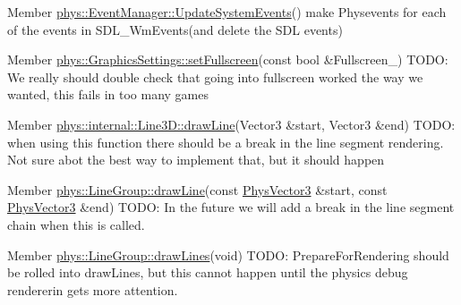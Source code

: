 \begin{DoxyDescription}
\item[Member \hyperlink{classphys_1_1EventManager_a0cf574c55def063d66d7db46a4d3e8a5}{phys::EventManager::UpdateSystemEvents}() ]make Physevents for each of the events in SDL\_\-WmEvents(and delete the SDL events) 
\end{DoxyDescription}

\label{dd/da0/todo__todo000007}
\hypertarget{dd/da0/todo__todo000007}{}
 
\begin{DoxyDescription}
\item[Member \hyperlink{classphys_1_1GraphicsSettings_aba9e127ab2cf3f20604313e39d32f7a8}{phys::GraphicsSettings::setFullscreen}(const bool \&Fullscreen\_\-) ]TODO: We really should double check that going into fullscreen worked the way we wanted, this fails in too many games 
\end{DoxyDescription}

\label{dd/da0/todo__todo000008}
\hypertarget{dd/da0/todo__todo000008}{}
 
\begin{DoxyDescription}
\item[Member \hyperlink{classphys_1_1internal_1_1Line3D_a0320e600b9f363036c63eb47527bb854}{phys::internal::Line3D::drawLine}(Vector3 \&start, Vector3 \&end) ]TODO: when using this function there should be a break in the line segment rendering. Not sure abot the best way to implement that, but it should happen 
\end{DoxyDescription}

\label{dd/da0/todo__todo000010}
\hypertarget{dd/da0/todo__todo000010}{}
 
\begin{DoxyDescription}
\item[Member \hyperlink{classphys_1_1LineGroup_aed46446e634948f8c73a5b26406cb5af}{phys::LineGroup::drawLine}(const \hyperlink{classPhysVector3}{PhysVector3} \&start, const \hyperlink{classPhysVector3}{PhysVector3} \&end) ]TODO: In the future we will add a break in the line segment chain when this is called. 
\end{DoxyDescription}

\label{dd/da0/todo__todo000011}
\hypertarget{dd/da0/todo__todo000011}{}
 
\begin{DoxyDescription}
\item[Member \hyperlink{classphys_1_1LineGroup_ade1bb4f8e1164e1b8d7aeabbc970b79d}{phys::LineGroup::drawLines}(void) ]TODO: PrepareForRendering should be rolled into drawLines, but this cannot happen until the physics debug rendererin gets more attention. 
\end{DoxyDescription}

